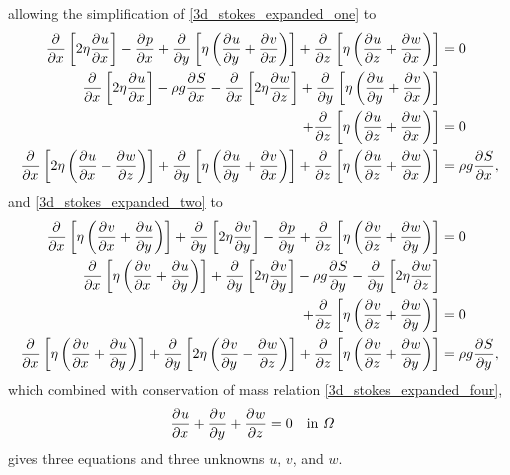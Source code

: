 allowing the simplification of \cref{3d_stokes_expanded_one} to
{\tiny
\begin{align}
  \parder{}{x} \left[2\eta \parder{u}{x} \right]  - \parder{p}{x} + \parder{}{y} \left[\eta \left( \parder{u}{y} + \parder{v}{x} \right) \right] + \parder{}{z} \left[\eta \left( \parder{u}{z} + \parder{w}{x} \right) \right] &= 0 \notag \\ 
  \parder{}{x} \left[2\eta \parder{u}{x} \right]  - \rho g\parder{S}{x} - \parder{}{x} \left[ 2\eta \parder{w}{z} \right] + \parder{}{y} \left[\eta \left( \parder{u}{y} + \parder{v}{x} \right) \right] & \notag \\
  + \parder{}{z} \left[\eta \left( \parder{u}{z} + \parder{w}{x} \right) \right] &= 0 \notag \\ 
  \label{first_stokes_exp_stress_simp}
  \parder{}{x} \left[2\eta \left( \parder{u}{x} - \parder{w}{z} \right) \right]  + \parder{}{y} \left[\eta \left( \parder{u}{y} + \parder{v}{x} \right) \right] + \parder{}{z} \left[\eta \left( \parder{u}{z} + \parder{w}{x} \right) \right] &= \rho g\parder{S}{x},
\end{align}}
and \cref{3d_stokes_expanded_two} to
{\tiny
\begin{align}
  \parder{}{x} \left[\eta \left( \parder{v}{x} + \parder{u}{y} \right) \right]  + \parder{}{y} \left[2\eta \parder{v}{y} \right] - \parder{p}{y} + \parder{}{z} \left[\eta \left( \parder{v}{z} + \parder{w}{y} \right) \right] &= 0 \notag \\ 
  \parder{}{x} \left[\eta \left( \parder{v}{x} + \parder{u}{y} \right) \right]  + \parder{}{y} \left[2\eta \parder{v}{y} \right] - \rho g\parder{S}{y} - \parder{}{y} \left[ 2\eta \parder{w}{z} \right] &\notag \\
  + \parder{}{z} \left[\eta \left( \parder{v}{z} + \parder{w}{y} \right) \right] &= 0 \notag \\ 
  \label{second_stokes_exp_stress_simp}
  \parder{}{x} \left[\eta \left( \parder{v}{x} + \parder{u}{y} \right) \right]  + \parder{}{y} \left[2\eta \left( \parder{v}{y} - \parder{w}{z} \right) \right] + \parder{}{z} \left[\eta \left( \parder{v}{z} + \parder{w}{y} \right) \right] &= \rho g \parder{S}{y},
\end{align}}
which combined with conservation of mass relation \cref{3d_stokes_expanded_four},
\begin{align*}
  \frac{\partial{^{}} u}{\partial x{^{}} } + \frac{\partial{^{}} v}{\partial y{^{}} } + \frac{\partial{^{}} w}{\partial z{^{}} } &= 0 && \text{in } \varOmega 
\end{align*}
gives three equations and three unknowns $u$, $v$, and $w$.

